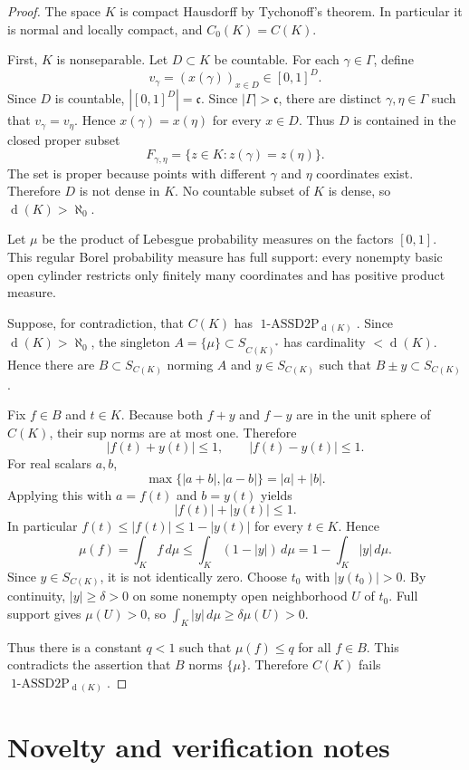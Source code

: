 \documentclass[11pt]{amsart}
\theoremstyle{remark}
\DeclareMathOperator{\dens}{d}
\DeclareMathOperator{\ASSD}{1\mbox{-}ASSD2P}
\newcommand{\cardc}{\mathfrak c}
\begin{document}
\begin{proof}
The space $K$ is compact Hausdorff by Tychonoff's theorem.  In particular it
is normal and locally compact, and $C_0(K)=C(K)$.

First, $K$ is nonseparable.  Let $D\subset K$ be countable.  For each
$\gamma\in\Gamma$, define
\[
        v_\gamma=(x(\gamma))_{x\in D}\in [0,1]^D .
\]
Since $D$ is countable, $|[0,1]^D|=\cardc$.  Since $|\Gamma|>\cardc$, there
are distinct $\gamma,\eta\in\Gamma$ such that $v_\gamma=v_\eta$.  Hence
$x(\gamma)=x(\eta)$ for every $x\in D$.  Thus $D$ is contained in the closed
proper subset
\[
        F_{\gamma,\eta}=\{z\in K: z(\gamma)=z(\eta)\}.
\]
The set is proper because points with different $\gamma$ and $\eta$
coordinates exist.  Therefore $D$ is not dense in $K$.  No countable subset of
$K$ is dense, so $\dens(K)>\aleph_0$.

Let $\mu$ be the product of Lebesgue probability measures on the factors
$[0,1]$.  This regular Borel probability measure has full support: every
nonempty basic open cylinder restricts only finitely many coordinates and has
positive product measure.

Suppose, for contradiction, that $C(K)$ has $\ASSD_{\dens(K)}$.  Since
$\dens(K)>\aleph_0$, the singleton $A=\{\mu\}\subset S_{C(K)^*}$ has
cardinality $<\dens(K)$.  Hence there are $B\subset S_{C(K)}$ norming $A$ and
$y\in S_{C(K)}$ such that $B\pm y\subset S_{C(K)}$.

Fix $f\in B$ and $t\in K$.  Because both $f+y$ and $f-y$ are in the unit
sphere of $C(K)$, their sup norms are at most one.  Therefore
\[
        |f(t)+y(t)|\le 1,\qquad |f(t)-y(t)|\le 1.
\]
For real scalars $a,b$,
\[
        \max\{|a+b|,|a-b|\}=|a|+|b|.
\]
Applying this with $a=f(t)$ and $b=y(t)$ yields
\[
        |f(t)|+|y(t)|\le 1.
\]
In particular $f(t)\le |f(t)|\le 1-|y(t)|$ for every $t\in K$.  Hence
\[
        \mu(f)=\int_K f\,d\mu
        \le \int_K (1-|y|)\,d\mu
        =1-\int_K |y|\,d\mu .
\]
Since $y\in S_{C(K)}$, it is not identically zero.  Choose $t_0$ with
$|y(t_0)|>0$.  By continuity, $|y|\ge\delta>0$ on some nonempty open
neighborhood $U$ of $t_0$.  Full support gives $\mu(U)>0$, so
$\int_K |y|\,d\mu\ge \delta\mu(U)>0$.

Thus there is a constant $q<1$ such that $\mu(f)\le q$ for all $f\in B$.
This contradicts the assertion that $B$ norms $\{\mu\}$.  Therefore
$C(K)$ fails $\ASSD_{\dens(K)}$.
\end{proof}

\section*{Novelty and verification notes}
\end{document}

